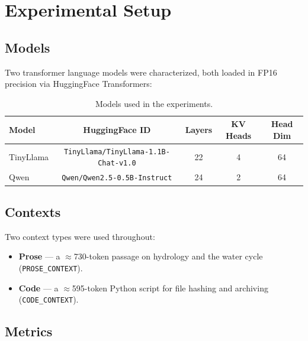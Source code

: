 \documentclass[11pt,a4paper]{article}
\begin{document}
\newpage

\section{Experimental Setup}

\subsection{Models}

Two transformer language models were characterized, both loaded in FP16
precision via HuggingFace Transformers:

\begin{table}[H]
\centering
\caption{Models used in the experiments.}
\begin{tabular}{lcccc}
\toprule
\textbf{Model} & \textbf{HuggingFace ID} & \textbf{Layers} &
\textbf{KV Heads} & \textbf{Head Dim} \\
\midrule
TinyLlama    & \texttt{TinyLlama/TinyLlama-1.1B-Chat-v1.0} & 22 & 4 & 64 \\
Qwen         & \texttt{Qwen/Qwen2.5-0.5B-Instruct}         & 24 & 2 & 64 \\
\bottomrule
\end{tabular}
\end{table}

\subsection{Contexts}

Two context types were used throughout:

\begin{itemize}
  \item \textbf{Prose} --- a $\approx$730-token passage on hydrology and
        the water cycle (\texttt{PROSE\_CONTEXT}).
  \item \textbf{Code} --- a $\approx$595-token Python script for file
        hashing and archiving (\texttt{CODE\_CONTEXT}).
\end{itemize}

\subsection{Metrics}
\end{document}
